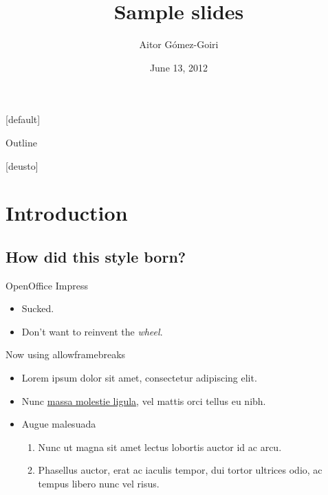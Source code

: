 \documentclass{beamer} %
\title{Sample slides}
\author{Aitor Gómez-Goiri}
\institute{DeustoTech - Deusto Institute of Technology, University of Deusto
\url{http://www.morelab.deusto.es}}
\date{June 13, 2012}
\begin{document}
  \owntitlepage
  
  {
    [default]
    
    \begin{frame}{Outline}  
      \transwipe
    \end{frame}
  }

  
[deusto]

\section{Introduction}

  \subsection{How did this style born?}
  
  \begin{frame}{OpenOffice Impress}
    \begin{itemize}
	\item Sucked.
	\pause
	\item Don't want to reinvent the \emph{wheel}.
    \end{itemize}
  \end{frame}
  

  \begin{frame}[allowframebreaks]{Now using allowframebreaks}
    \begin{itemize}
      \item Lorem ipsum dolor sit amet, consectetur adipiscing elit.
      \item Nunc \href{http://www.deusto.es/}{massa molestie ligula}, vel mattis orci tellus eu nibh.
      \framebreak
      \item Augue malesuada
      \begin{enumerate}
	  \item Nunc ut magna sit amet lectus lobortis auctor id ac arcu.
	  \item Phasellus auctor, erat ac iaculis tempor, dui tortor ultrices odio, ac tempus libero nunc vel risus.
	\end{enumerate}
    \end{itemize}
  \end{frame}
\end{document}
